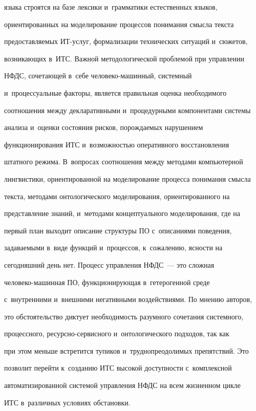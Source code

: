 языка строятся на базе лексики и~грамматики естественных языков,


ориентированных на моделирование процессов понимания смысла текста


предоставляемых ИТ-услуг, формализации технических ситуаций и~сюжетов,


возникающих в~ИТС. Важной методологической проблемой при управлении


НФДС, сочетающей в~себе че\-ло\-ве\-ко-ма\-шин\-ный, системный


и~процессуальные факторы, является правильная оценка необходимого


соотношения между декларативными и~процедурными компонентами системы


анализа и~оценки состояния рисков, порождаемых нарушением


функционирования ИТС и~возможностью оперативного восстановления


штатного режима. В~вопросах соотношения между методами компьютерной


лингвистики, ориентированной на моделирование процесса понимания смысла


текста, методами онтологического моделирования, ориентированного на


представление знаний, и~методами концептуального моделирования, где на


первый план выходит описание структуры ПО с~описаниями поведения,


задаваемыми в~виде функций и~процессов, к~сожалению, ясности на


сегодняшний день нет. Процесс управления НФДС~--- это сложная


  че\-ло\-ве\-ко-ма\-шин\-ная ПО, функционирующая в~гетерогенной среде


с~внутренними и~внешними негативными воздействиями. По мнению авторов,


это обстоятельство диктует необходимость разумного сочетания системного,


процессного, ре\-сурс\-но-сер\-вис\-но\-го и~онтологического подходов, так как


при этом меньше встретится тупиков и~труднопреодолимых препятствий. Это


позволит перейти к~созданию ИТС высокой доступности с~комплексной


автоматизированной системой управления НФДС на всем жизненном цикле


ИТС в~различных условиях обстановки.





